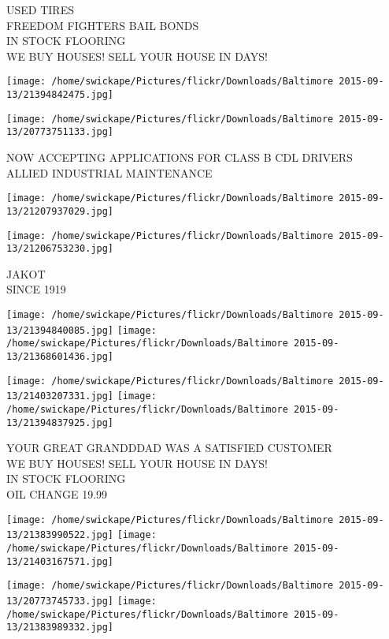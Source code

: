 \documentclass[10pt,letterpaper]{article}
\begin{document}
USED TIRES\\
FREEDOM FIGHTERS BAIL BONDS\\
IN STOCK FLOORING\\
WE BUY HOUSES!  SELL YOUR HOUSE IN DAYS!\\
\pagebreak

\texttt{[image: /home/swickape/Pictures/flickr/Downloads/Baltimore 2015-09-13/21394842475.jpg]}

\vspace{0.25in}
\texttt{[image: /home/swickape/Pictures/flickr/Downloads/Baltimore 2015-09-13/20773751133.jpg]}

NOW ACCEPTING APPLICATIONS FOR CLASS B CDL DRIVERS\\
ALLIED INDUSTRIAL MAINTENANCE\\
\pagebreak

\texttt{[image: /home/swickape/Pictures/flickr/Downloads/Baltimore 2015-09-13/21207937029.jpg]}

\vspace{0.25in}
\texttt{[image: /home/swickape/Pictures/flickr/Downloads/Baltimore 2015-09-13/21206753230.jpg]}

JAKOT\\
SINCE 1919\\
\pagebreak

\texttt{[image: /home/swickape/Pictures/flickr/Downloads/Baltimore 2015-09-13/21394840085.jpg]}
\texttt{[image: /home/swickape/Pictures/flickr/Downloads/Baltimore 2015-09-13/21368601436.jpg]}

\texttt{[image: /home/swickape/Pictures/flickr/Downloads/Baltimore 2015-09-13/21403207331.jpg]}
\texttt{[image: /home/swickape/Pictures/flickr/Downloads/Baltimore 2015-09-13/21394837925.jpg]}

YOUR GREAT GRANDDDAD WAS A SATISFIED CUSTOMER\\
WE BUY HOUSES!  SELL YOUR HOUSE IN DAYS!\\
IN STOCK FLOORING\\
OIL CHANGE 19.99\\
\pagebreak

\texttt{[image: /home/swickape/Pictures/flickr/Downloads/Baltimore 2015-09-13/21383990522.jpg]}
\texttt{[image: /home/swickape/Pictures/flickr/Downloads/Baltimore 2015-09-13/21403167571.jpg]}

\texttt{[image: /home/swickape/Pictures/flickr/Downloads/Baltimore 2015-09-13/20773745733.jpg]}
\texttt{[image: /home/swickape/Pictures/flickr/Downloads/Baltimore 2015-09-13/21383989332.jpg]}
\end{document}
